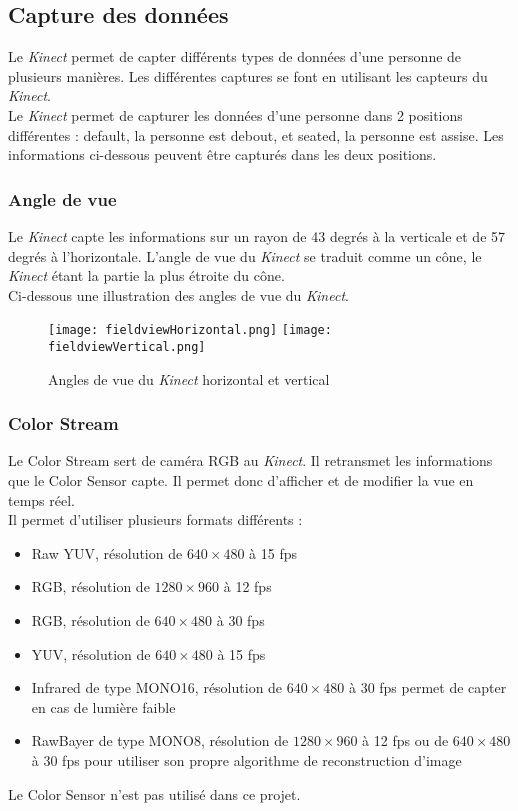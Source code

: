 \subsection{Capture des données}
Le \textit{Kinect} permet de capter différents types de données d'une personne de plusieurs manières. Les différentes captures se font en utilisant les capteurs du \textit{Kinect}.\\

Le \textit{Kinect} permet de capturer les données d'une personne dans 2 positions différentes : \textsf{default}, la personne est debout, et \textsf{seated}, la personne est assise. Les informations ci-dessous peuvent être capturés dans les deux positions. 
\pagebreak
\subsubsection{Angle de vue}
Le \textit{Kinect} capte les informations sur un rayon de 43 degrés à la verticale et de 57 degrés à l'horizontale. L'angle de vue du \textit{Kinect} se traduit comme un cône, le \textit{Kinect} étant la partie la plus étroite du cône.\\

Ci-dessous une illustration des angles de vue du \textit{Kinect}.
\begin{figure}[H]
	\texttt{[image: fieldviewHorizontal.png]}
	\texttt{[image: fieldviewVertical.png]}
	\caption{\label{AngleVue} Angles de vue du \textit{Kinect} horizontal et vertical}
\end{figure}

\subsubsection{Color Stream}
Le \textsf{Color Stream} sert de caméra RGB au \textit{Kinect}. Il retransmet les informations que le \textsf{Color Sensor} capte. Il permet donc d'afficher et de modifier la vue en temps réel. \\

Il permet d'utiliser plusieurs formats différents :  
\begin{itemize}
\item Raw YUV, résolution de $640\times 480$ à 15 fps 
\item RGB, résolution de $1280\times 960$ à 12 fps
\item RGB, résolution de $640\times 480$ à 30 fps
\item YUV, résolution de $640\times 480$ à 15 fps
\item Infrared de type MONO16, résolution de $640\times 480$ à 30 fps permet de capter en cas de lumière faible
\item RawBayer de type MONO8, résolution de $1280\times 960$ à 12 fps ou  de $640\times 480$ à 30 fps pour utiliser son propre algorithme de reconstruction d'image
\end{itemize}
Le \textsf{Color Sensor} n'est pas utilisé dans ce projet.


